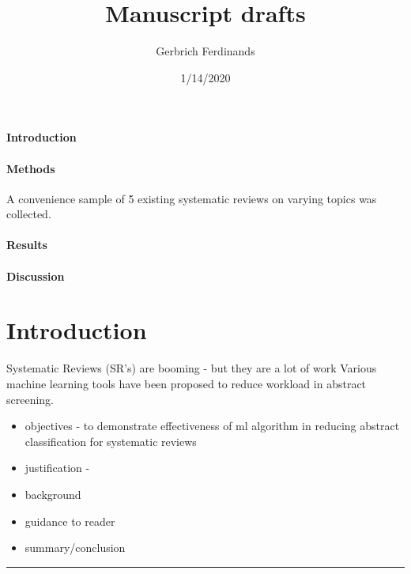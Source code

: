 \documentclass[
]{article}
\title{Manuscript drafts}
\author{Gerbrich Ferdinands}
\date{1/14/2020}
\providecommand{\tightlist}{%
  \setlength{\itemsep}{0pt}\setlength{\parskip}{0pt}}
\begin{document}
\maketitle

\hypertarget{introduction}{%
\paragraph{Introduction}\label{introduction}}

\hypertarget{methods}{%
\paragraph{Methods}\label{methods}}

A convenience sample of 5 existing systematic reviews on varying topics
was collected.

\hypertarget{results}{%
\paragraph{Results}\label{results}}

\hypertarget{discussion}{%
\paragraph{Discussion}\label{discussion}}

\newpage

\hypertarget{introduction-1}{%
\section{Introduction}\label{introduction-1}}

Systematic Reviews (SR's) are booming - but they are a lot of work
Various machine learning tools have been proposed to reduce workload in
abstract screening.

\begin{itemize}
\tightlist
\item
  objectives - to demonstrate effectiveness of ml algorithm in reducing
  abstract classification for systematic reviews
\item
  justification -
\item
  background
\item
  guidance to reader
\item
  summary/conclusion
\end{itemize}

\begin{center}\rule{0.5\linewidth}{0.5pt}\end{center}
\end{document}

